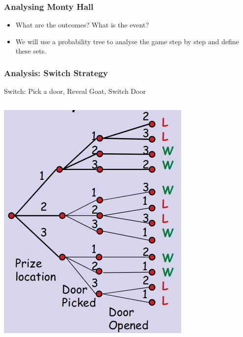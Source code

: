\documentclass{beamer}
\begin{document}
\begin{frame}
  \frametitle{Analysing Monty Hall}

  {\large
    \begin{itemize}
    \item What are the outcomes? What is the event?
      \bigskip
      
    \item We will use a \alert{probability tree} to analyse the game
      step by step and define these sets.
    \end{itemize}
  }
\end{frame}

\begin{frame}
  \frametitle{Analysis: Switch Strategy}

  {\large
    \alert{Switch: Pick a door, Reveal Goat, Switch Door}

    \begin{columns}
      \includegraphics[width=\textwidth]{../img/monty_tree_1}


\end{columns}}
\end{frame}
\end{document}
